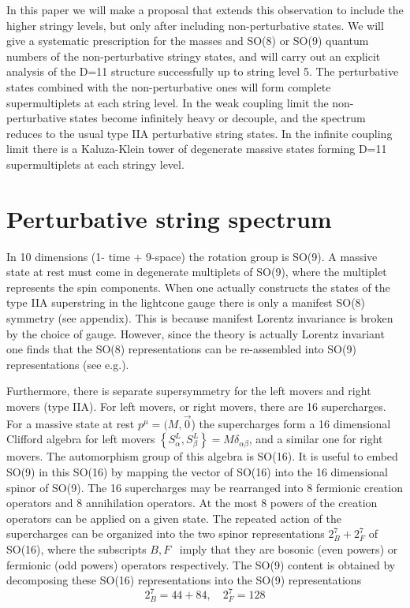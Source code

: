 In this paper we will make a proposal that extends this observation to
include the higher stringy levels, but only after including non-perturbative
states. We will give a systematic prescription for the masses and SO(8) or
SO(9) quantum numbers of the non-perturbative stringy states, and will carry
out an explicit analysis of the D=11 structure successfully up to string
level 5. The perturbative states combined with the non-perturbative ones
will form complete supermultiplets at each string level. In the weak
coupling limit the non-perturbative states become infinitely heavy or
decouple, and the spectrum reduces to the usual type IIA perturbative string
states. In the infinite coupling limit there is a Kaluza-Klein tower of
degenerate massive states forming D=11 supermultiplets at each stringy level.

\section{Perturbative string spectrum}

In 10 dimensions (1- time + 9-space) the rotation group is SO(9). A massive
state at rest must come in degenerate multiplets of SO(9), where the
multiplet represents the spin components. When one actually constructs the
states of the type IIA superstring in the lightcone gauge there is only a
manifest SO(8) symmetry (see appendix). This is because manifest Lorentz
invariance is broken by the choice of gauge. However, since the theory is
actually Lorentz invariant one finds that the SO(8) representations can be
re-assembled into SO(9) representations (see e.g.\cite{GSW}).

Furthermore, there is separate supersymmetry for the left movers and right
movers (type IIA). For left movers, or right movers, there are 16
supercharges. For a massive state at rest $p^\mu =(M,\vec 0$) the
supercharges form a 16 dimensional Clifford algebra for left movers $\left\{
S_\alpha ^L,S_\beta ^L\right\} =M\delta _{\alpha \beta }$, and a similar one
for right movers. The automorphism group of this algebra is SO(16). It is
useful to embed SO(9) in this SO(16) by mapping the vector of SO(16) into
the 16 dimensional spinor of SO(9). The 16 supercharges may be rearranged
into 8 fermionic creation operators and 8 annihilation operators. At the
most 8 powers of the creation operators can be applied on a given state. The
repeated action of the supercharges can be organized into the two spinor
representations $2_B^7+2_F^7$ of SO(16), where the subscripts $B,F\,\,\,$%
imply that they are bosonic (even powers) or fermionic (odd powers)
operators respectively. The SO(9) content is obtained by decomposing these
SO(16) representations into the SO(9) representations
\begin{equation}
2_B^7=44+84,\quad 2_F^7=128
\end{equation}

